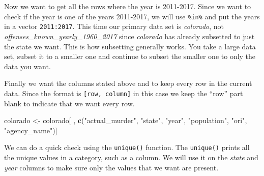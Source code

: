 \documentclass[
  12pt,
]{book}
\newenvironment{Shaded}{\begin{snugshade}}{\end{snugshade}}
\newcommand{\CommentTok}[1]{\textcolor[rgb]{0.37,0.37,0.37}{\textit{#1}}}
\newcommand{\DecValTok}[1]{\textcolor[rgb]{0.06,0.06,0.06}{#1}}
\newcommand{\KeywordTok}[1]{\textcolor[rgb]{0.27,0.27,0.27}{\textbf{#1}}}
\newcommand{\NormalTok}[1]{#1}
\newcommand{\OperatorTok}[1]{\textcolor[rgb]{0.43,0.43,0.43}{\textbf{#1}}}
\newcommand{\StringTok}[1]{\textcolor[rgb]{0.5,0.5,0.5}{#1}}
\begin{document}
Now we want to get all the rows where the year is 2011-2017. Since we want to check if the year is one of the years 2011-2017, we will use \texttt{\%in\%} and put the years in a vector \texttt{2011:2017}. This time our primary data set is \emph{colorado}, not \emph{offenses\_known\_yearly\_1960\_2017} since \emph{colorado} has already subsetted to just the state we want. This is how subsetting generally works. You take a large data set, subset it to a smaller one and continue to subset the smaller one to only the data you want.

\begin{Shaded}
\end{Shaded}

Finally we want the columns stated above and to keep every row in the current data. Since the format is \texttt{{[}row,\ column{]}} in this case we keep the ``row'' part blank to indicate that we want every row.

\begin{Shaded}
\begin{Highlighting}[]
\NormalTok{colorado <{-}}\StringTok{ }\NormalTok{colorado[ , }\KeywordTok{c}\NormalTok{(}\StringTok{"actual\_murder"}\NormalTok{, }\StringTok{"state"}\NormalTok{, }\StringTok{"year"}\NormalTok{, }\StringTok{"population"}\NormalTok{, }\StringTok{"ori"}\NormalTok{, }\StringTok{"agency\_name"}\NormalTok{)]}
\end{Highlighting}
\end{Shaded}

We can do a quick check using the \texttt{unique()} function. The \texttt{unique()} prints all the unique values in a category, such as a column. We will use it on the \emph{state} and \emph{year} columns to make sure only the values that we want are present.

\begin{Shaded}
\end{Shaded}

\begin{Shaded}
\end{Shaded}
\end{document}
